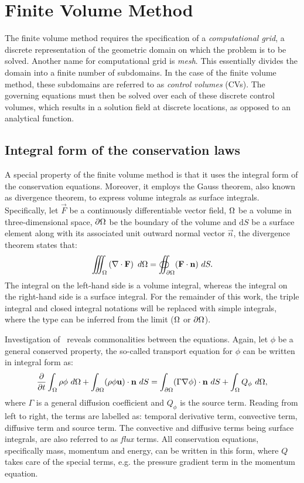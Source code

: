 \section{Finite Volume Method}
\label{sec:fv}
%
%
The finite volume method requires the specification of a \textit{computational grid}, a discrete representation of the geometric domain on which the problem is to be solved. Another name for computational grid is \textit{mesh}. This essentially divides the domain into a finite number of subdomains. In the case of the finite volume method, these subdomains are referred to as \textit{control volumes} (CVs). The governing equations must then be solved over each of these discrete control volumes, which results in a solution field at discrete locations, as opposed to an analytical function. 

\subsection{Integral form of the conservation laws}
A special property of the finite volume method is that it uses the integral form of the conservation equations. Moreover, it employs the Gauss theorem, also known as divergence theorem, to express volume integrals as surface integrals. Specifically, let $\vec{F}$ be a continuously differentiable vector field, $\Omega$ be a volume in three-dimensional space, $\partial \Omega$ be the boundary of the volume and $\text{d}S$ be a surface element along with its associated unit outward normal vector $\vec{n}$, the divergence theorem states that:
\begin{equation*}
    \iiint_{\Omega} \left( \nabla \cdot \mathbf{F} \right)~d\Omega = 
        \oiint_{\partial \Omega} (\mathbf{F}\cdot\mathbf{n})~dS.
\end{equation*}
The integral on the left-hand side is a volume integral, whereas the integral on the right-hand side is a surface integral. For the remainder of this work, the triple integral and closed integral notations will be replaced with simple integrals, where the type can be inferred from the limit ($\Omega$ or $\partial \Omega$). 

Investigation of~ reveals commonalities between the equations. Again, let $\phi$ be a general conserved property, the so-called transport equation for $\phi$ can be written in integral form as:
\begin{equation}
     \frac{\partial }{\partial t} \int_\Omega \rho \phi~d\Omega
        + \int_{\partial \Omega} (\rho \phi \mathbf{u})\cdot\mathbf{n}~dS
        = \int_{\partial \Omega} (\Gamma \nabla \phi)\cdot\mathbf{n}~dS
        + \int_\Omega Q_\phi~d\Omega
    \label{eq:fvtransport},
\end{equation}
where $\Gamma$ is a general diffusion coefficient and $Q_\phi$ is the source term. Reading from left to right, the terms are labelled as: temporal derivative term, convective term, diffusive term and source term. The convective and diffusive terms being surface integrals, are also referred to as \textit{flux} terms. All conservation equations, specifically mass, momentum and energy, can be written in this form, where $Q$ takes care of the special terms, e.g. the pressure gradient term in the momentum equation. 

